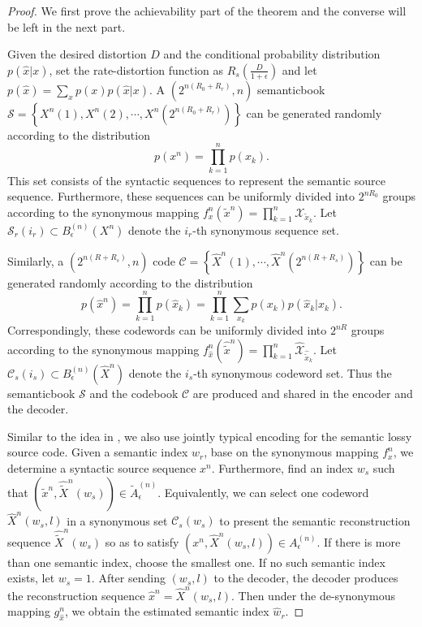\documentclass[12pt, draftclsnofoot,onecolumn]{IEEEtran}
\begin{document}
\begin{proof}
We first prove the achievability part of the theorem and the converse will be left in the next part.

Given the desired distortion $D$ and the conditional probability distribution $p(\hat{x}|x)$, set the rate-distortion function as $R_s(\frac{D}{1+\epsilon})$ and let $p(\hat{x})=\sum_{x}p(x)p(\hat{x}|x)$. A $\left(2^{n(R_0+R_r)},n\right)$ semanticbook $\mathcal{S}=\left\{X^n(1),X^n(2),\cdots,X^n(2^{n(R_0+R_r)})\right\}$ can be generated randomly according to the distribution
\begin{equation}
p(x^n)=\prod_{k=1}^{n} p(x_k).
\end{equation}
This set consists of the syntactic sequences to represent the semantic source sequence. Furthermore, these sequences can be uniformly divided into $2^{nR_0}$ groups according to the synonymous mapping $f_x^n(\tilde{x}^n)=\prod_{k=1}^{n}\mathcal{X}_{\tilde{x}_{k}}$. Let $\mathcal{S}_r(i_r)\subset B_{\epsilon}^{(n)}(X^n)$ denote the $i_r$-th synonymous sequence set.

Similarly, a $\left(2^{n(R+R_s)},n\right)$ code $\mathcal{C}=\left\{\hat{X}^{n}(1),\cdots,\hat{X}^{n}(2^{n(R+R_s)})\right\}$ can be generated randomly according to the distribution
\begin{equation}
p(\hat{x}^n)=\prod_{k=1}^{n} p(\hat{x}_k)=\prod_{k=1}^n \sum_{x_k}p(x_k)p(\hat{x}_k|x_k).
\end{equation}
Correspondingly, these codewords can be uniformly divided into $2^{nR}$ groups according to the synonymous mapping
$f_{\hat{x}}^n(\hat{\tilde{x}}^n)=\prod_{k=1}^{n}\hat{\mathcal{X}}_{\hat{\tilde{x}}_{k}}$. Let $\mathcal{C}_s(i_s)\subset B_{\epsilon}^{(n)}(\hat{X}^n)$ denote the $i_s$-th synonymous codeword set. Thus the semanticbook $\mathcal{S}$ and the codebook $\mathcal{C}$ are produced and shared in the encoder and the decoder.

Similar to the idea in \cite{Book_ElGamal}, we also use jointly typical encoding for the semantic lossy source code. Given a semantic index $w_r$, base on the synonymous mapping $f_x^n$, we determine a syntactic source sequence $x^n$. Furthermore, find an index $w_s$ such that $(\tilde{x}^n,\hat{\tilde{X}}^n(w_s))\in \tilde{A}_{\epsilon}^{(n)}$. Equivalently, we can select one codeword $\hat{X}^n(w_s,l)$ in a synonymous set $\mathcal{C}_s(w_s)$ to present the semantic reconstruction sequence $\hat{\tilde{X}}^n(w_s)$ so as to satisfy $(x^n,\hat{X}^n(w_s,l))\in A_{\epsilon}^{(n)}$. If there is more than one semantic index, choose the smallest one. If no such semantic index exists, let $w_s=1$. After sending $(w_s,l)$ to the decoder, the decoder produces the reconstruction sequence $\hat{x}^n=\hat{X}^n(w_s,l)$. Then under the de-synonymous mapping $g_{\hat{x}}^n$, we obtain the estimated semantic index $\hat{w}_r$.


\end{proof}
\end{document}
